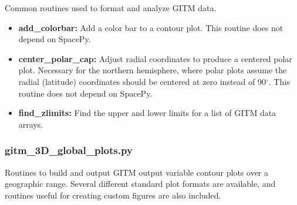 Common routines used to format and analyze GITM data.

\begin{itemize}
\item[]{{\bf add\_colorbar:}  Add a color bar to a contour plot.  This routine does not depend on SpacePy.}
\item[]{{\bf center\_polar\_cap:}  Adjust radial coordinates to produce a centered polar plot.  Necessary for the northern hemisphere, where polar plots assume the radial (latitude) coordinates should be centered at zero instead of 90$^\circ$.  This routine does not depend on SpacePy.}
\item[]{{\bf find\_zlimits:}  Find the upper and lower limits for a list of GITM data arrays.}
\end{itemize}

\subsubsection{gitm\_3D\_global\_plots.py}

Routines to build and output GITM output variable contour plots over a geographic range.  Several different standard plot formats are available, and routines useful for creating custom figures are also included.

